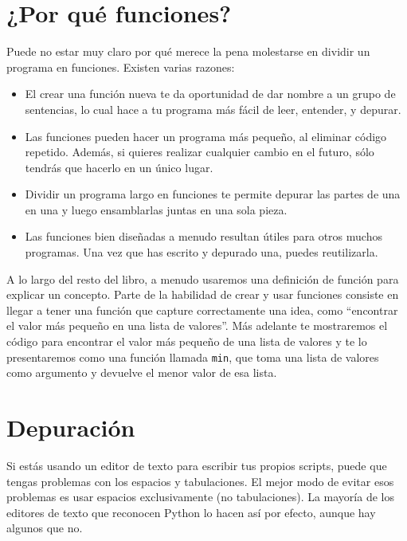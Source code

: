 \section{¿Por qué funciones?}

Puede no estar muy claro por qué merece la pena molestarse en dividir
un programa en funciones. Existen varias razones:

\begin{itemize}

\item El crear una función nueva te da oportunidad de dar nombre a un grupo
de sentencias, lo cual hace a tu programa más fácil de leer, entender,
y depurar.

\item Las funciones pueden hacer un programa más pequeño, al eliminar código
repetido. Además, si quieres realizar cualquier cambio en el futuro, sólo tendrás
que hacerlo en un único lugar.

\item Dividir un programa largo en funciones te permite depurar las
partes de una en una y luego ensamblarlas juntas en una sola pieza.

\item Las funciones bien diseñadas a menudo resultan útiles para otros muchos programas.
Una vez que has escrito y depurado una, puedes reutilizarla.

\end{itemize}

A lo largo del resto del libro, a menudo usaremos una definición de función para
explicar un concepto. Parte de la habilidad de crear y usar funciones consiste en llegar a
tener una función que capture correctamente una idea, como ``encontrar el valor
más pequeño en una lista de valores''. Más adelante te mostraremos el código para
encontrar el valor más pequeño de una lista de valores y te lo presentaremos como
una función llamada {\tt min}, que toma una lista de valores como argumento y
devuelve el menor valor de esa lista.


\section{Depuración}
\label{editor}

Si estás usando un editor de texto para escribir tus propios scripts, puede
que tengas problemas con los espacios y tabulaciones. El mejor modo de evitar
esos problemas es usar espacios exclusivamente (no tabulaciones). La mayoría
de los editores de texto que reconocen Python lo hacen así por efecto, aunque
hay algunos que no.

